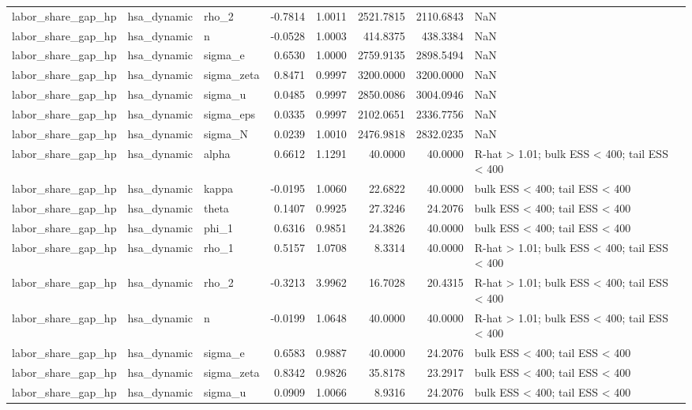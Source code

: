 \begin{tabular}{lllrrrrl}
labor\_share\_gap\_hp & hsa\_dynamic & rho\_2 & -0.7814 & 1.0011 & 2521.7815 & 2110.6843 & NaN \\
labor\_share\_gap\_hp & hsa\_dynamic & n & -0.0528 & 1.0003 & 414.8375 & 438.3384 & NaN \\
labor\_share\_gap\_hp & hsa\_dynamic & sigma\_e & 0.6530 & 1.0000 & 2759.9135 & 2898.5494 & NaN \\
labor\_share\_gap\_hp & hsa\_dynamic & sigma\_zeta & 0.8471 & 0.9997 & 3200.0000 & 3200.0000 & NaN \\
labor\_share\_gap\_hp & hsa\_dynamic & sigma\_u & 0.0485 & 0.9997 & 2850.0086 & 3004.0946 & NaN \\
labor\_share\_gap\_hp & hsa\_dynamic & sigma\_eps & 0.0335 & 0.9997 & 2102.0651 & 2336.7756 & NaN \\
labor\_share\_gap\_hp & hsa\_dynamic & sigma\_N & 0.0239 & 1.0010 & 2476.9818 & 2832.0235 & NaN \\
labor\_share\_gap\_hp & hsa\_dynamic & alpha & 0.6612 & 1.1291 & 40.0000 & 40.0000 & R-hat > 1.01; bulk ESS < 400; tail ESS < 400 \\
labor\_share\_gap\_hp & hsa\_dynamic & kappa & -0.0195 & 1.0060 & 22.6822 & 40.0000 & bulk ESS < 400; tail ESS < 400 \\
labor\_share\_gap\_hp & hsa\_dynamic & theta & 0.1407 & 0.9925 & 27.3246 & 24.2076 & bulk ESS < 400; tail ESS < 400 \\
labor\_share\_gap\_hp & hsa\_dynamic & phi\_1 & 0.6316 & 0.9851 & 24.3826 & 40.0000 & bulk ESS < 400; tail ESS < 400 \\
labor\_share\_gap\_hp & hsa\_dynamic & rho\_1 & 0.5157 & 1.0708 & 8.3314 & 40.0000 & R-hat > 1.01; bulk ESS < 400; tail ESS < 400 \\
labor\_share\_gap\_hp & hsa\_dynamic & rho\_2 & -0.3213 & 3.9962 & 16.7028 & 20.4315 & R-hat > 1.01; bulk ESS < 400; tail ESS < 400 \\
labor\_share\_gap\_hp & hsa\_dynamic & n & -0.0199 & 1.0648 & 40.0000 & 40.0000 & R-hat > 1.01; bulk ESS < 400; tail ESS < 400 \\
labor\_share\_gap\_hp & hsa\_dynamic & sigma\_e & 0.6583 & 0.9887 & 40.0000 & 24.2076 & bulk ESS < 400; tail ESS < 400 \\
labor\_share\_gap\_hp & hsa\_dynamic & sigma\_zeta & 0.8342 & 0.9826 & 35.8178 & 23.2917 & bulk ESS < 400; tail ESS < 400 \\
labor\_share\_gap\_hp & hsa\_dynamic & sigma\_u & 0.0909 & 1.0066 & 8.9316 & 24.2076 & bulk ESS < 400; tail ESS < 400 \\

\end{tabular}
